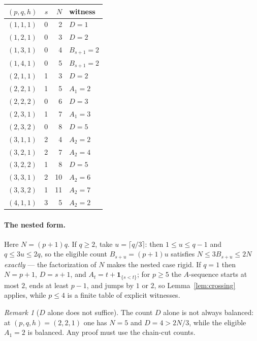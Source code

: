 \documentclass[11pt]{article}
\theoremstyle{definition}
\theoremstyle{remark}
\newtheorem{remark}[theorem]{Remark}
\begin{document}
\begin{center}
\begin{tabular}{@{}lrrl@{}}\toprule
$(p,q,h)$ & $s$ & $N$ & witness \\ \midrule
$(1,1,1)$ & 0 & 2 & $D=1$\\
$(1,2,1)$ & 0 & 3 & $D=2$\\
$(1,3,1)$ & 0 & 4 & $B_{s+1}=2$\\
$(1,4,1)$ & 0 & 5 & $B_{s+1}=2$\\
$(2,1,1)$ & 1 & 3 & $D=2$\\
$(2,2,1)$ & 1 & 5 & $A_1=2$\\
$(2,2,2)$ & 0 & 6 & $D=3$\\
$(2,3,1)$ & 1 & 7 & $A_1=3$\\
$(2,3,2)$ & 0 & 8 & $D=5$\\
$(3,1,1)$ & 2 & 4 & $A_2=2$\\
$(3,2,1)$ & 2 & 7 & $A_2=4$\\
$(3,2,2)$ & 1 & 8 & $D=5$\\
$(3,3,1)$ & 2 & 10 & $A_2=6$\\
$(3,3,2)$ & 1 & 11 & $A_2=7$\\
$(4,1,1)$ & 3 & 5 & $A_2=2$\\ \bottomrule
\end{tabular}
\end{center}

\paragraph{The nested form.} Here $N=(p+1)q$. If $q\ge2$, take $u=\lceil q/3\rceil$: then
$1\le u\le q-1$ and $q\le 3u\le 2q$, so the eligible count $B_{s+u}=(p+1)u$ satisfies
$N\le 3B_{s+u}\le 2N$ \emph{exactly} --- the factorization of $N$ makes the nested case
rigid. If $q=1$ then $N=p+1$, $D=s+1$, and $A_t=t+\mathbf1_{\{s<t\}}$; for $p\ge5$ the
$A$-sequence starts at most $2$, ends at least $p-1$, and jumps by $1$ or $2$, so
Lemma~\ref{lem:crossing} applies, while $p\le4$ is a finite table of explicit witnesses.

\begin{remark}[$D$ alone does not suffice]
The count $D$ alone is not always balanced: at $(p,q,h)=(2,2,1)$ one has $N=5$ and
$D=4>2N/3$, while the eligible $A_1=2$ is balanced. Any proof must use the chain-cut
counts. %
\end{remark}
\end{document}

